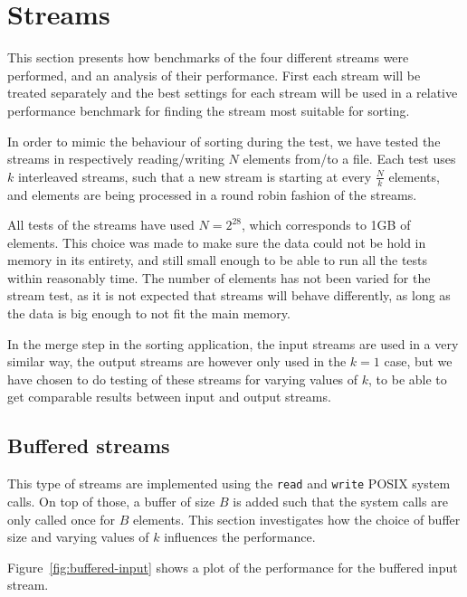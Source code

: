 \documentclass[a4paper,12pt]{article}
\begin{document}
\section{Streams}
This section presents how benchmarks of the four different
streams were performed, and an analysis of their performance. First each stream will
be treated separately and the best settings for each stream will be
used in a relative performance benchmark for finding the stream most
suitable for sorting.

In order to mimic the behaviour of sorting during the test, we have
tested the streams in respectively reading/writing $N$ elements from/to a file. Each test uses $k$ interleaved streams, such
that a new stream is starting at every $\frac{N}{k}$ elements, and
elements are being processed in a round robin fashion of the streams.

All tests of the streams have used $N = 2^{28}$, which corresponds to
1GB of elements. This choice was made to make sure the data could not be hold in memory in its entirety, and still small enough to be able to run all the tests within reasonably time. The
number of elements has not been varied for the stream test, as it is not
expected that streams will behave differently, as long as the data is
big enough to not fit the main memory.

In the merge step in the sorting application, the input streams are
used in a very similar way, the output streams are however only used
in the $k = 1$ case, but we have chosen to do testing of these streams
for varying values of $k$, to be able to get comparable results
between input and output streams.

\subsection{Buffered streams}
\label{sec:buffered-streams}
This type of streams are implemented using the \texttt{read} and
\texttt{write} POSIX system calls. On top of those, a buffer of size
$B$ is added such that the system calls are only called once for $B$ elements. This section investigates how the choice of buffer size and varying
values of $k$ influences the
performance.

Figure~\ref{fig:buffered-input} shows a plot of the performance for the buffered input stream.
\end{document}
